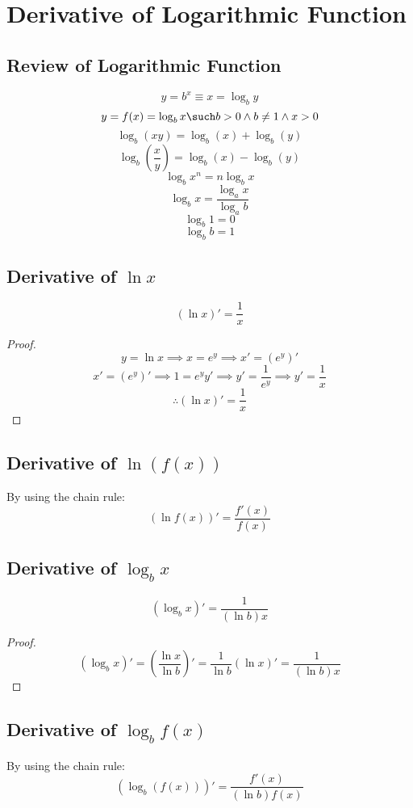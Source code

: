 \section{Derivative of Logarithmic Function}
\subsection{Review of Logarithmic Function}
	\[y = b^x \equiv x=\log_b y\]
	\[y=f(x)=\log_b x \such b > 0 \land b \neq 1 \land x > 0\]
	\[\log_b(xy) = \log_b(x) + \log_b(y)\]
	\[\log_b \left(\frac{x}{y}\right) = \log_b(x) - \log_b(y)\]
	\[\log_b x^n = n\log_b x\]
	\[\log_b x = \frac{\log_a x}{\log_a b}\]
	\[\log_b 1 = 0\]
	\[\log_b b = 1\]
\subsection{Derivative of $\ln x$}
	\[(\ln x)' = \frac{1}{x}\]
	\begin{proof}
		\[y = \ln x \implies x = e^y \implies x' = (e^y)'\]
		\[x' = (e^y)' \implies 1 = e^yy' \implies y' = \frac{1}{e^y} \implies y'=\frac{1}{x}\]
		\[\therefore (\ln x)' = \frac{1}{x}\]
	\end{proof}
\subsection{Derivative of $\ln(f(x))$}
	By using the chain rule:
	\[\left( \ln f(x) \right)' = \frac{f'(x)}{f(x)}\]
\subsection{Derivative of $\log_b x$}
	\[( \log_b x )' = \frac{1}{(\ln b)x}\]
	\begin{proof}
		\[(\log_b x)' = \left( \frac{\ln x}{\ln b} \right)' = \frac{1}{\ln b}(\ln x)' = \frac{1}{(\ln b) x}\]
	\end{proof}
\subsection{Derivative of $\log_b f(x)$}
	By using the chain rule:
	\[\left( \log_b \left( f(x) \right)\right)' = \frac{f'(x)}{(\ln b)f(x)}\]
